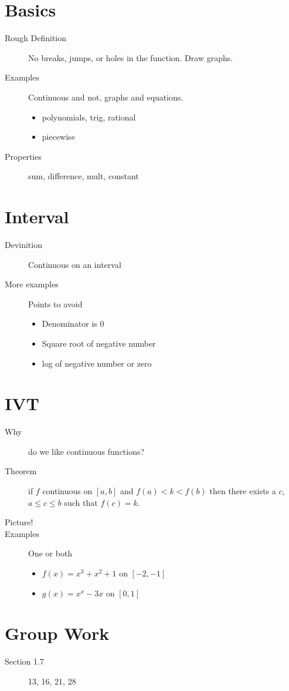 \documentclass[11pt]{article}
\begin{document}
\drawtitle

\section*{Basics}
\begin{description}
\item[Rough Definition] No breaks, jumps, or holes in the function.
  Draw graphs.
\item[Examples] Continuous and not, graphs and equations.
  \begin{itemize}
  \item polynomials, trig, rational
  \item piecewise
  \end{itemize}
\item[Properties] sum, difference, mult, constant
\end{description}

\section*{Interval}
\begin{description}
\item[Devinition] Continuous on an interval
\item[More examples] Points to avoid
  \begin{itemize}
  \item Denominator is 0
  \item Square root of negative number
  \item log of negative number or zero
  \end{itemize}
\end{description}

\section*{IVT}
\begin{description}
\item[Why] do we like continuous functions?
\item[Theorem] if $f$ continuous on $[a,b]$ and $f(a)<k<f(b)$ then
  there exists a $c$, $a\leq c\leq b$ such that $f(c)=k$.
\item[Picture!]
\item[Examples] One or both
  \begin{itemize}
  \item $f(x)=x^3+x^2+1$ on $[-2,-1]$
  \item $g(x)=x^x-3x$ on $[0,1]$
  \end{itemize}
\end{description}

\section*{Group Work}
\begin{description}
\item[Section 1.7] 13, 16, 21, 28
\end{description}
\end{document}
